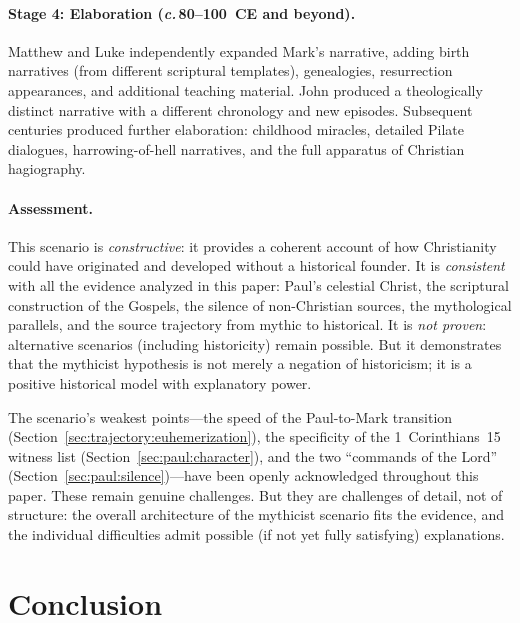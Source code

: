 \documentclass[12pt,oneside]{article}
\newcommand{\circa}{\textit{c.}\,}
\begin{document}
\paragraph{Stage 4: Elaboration (\circa 80--100~CE and beyond).}
Matthew and Luke independently expanded Mark's narrative, adding birth
narratives (from different scriptural templates), genealogies,
resurrection appearances, and additional teaching material.  John
produced a theologically distinct narrative with a different chronology
and new episodes.  Subsequent centuries produced further elaboration:
childhood miracles, detailed Pilate dialogues, harrowing-of-hell
narratives, and the full apparatus of Christian hagiography.

\paragraph{Assessment.}
This scenario is \textit{constructive}: it provides a coherent account
of how Christianity could have originated and developed without a
historical founder.  It is \textit{consistent} with all the evidence
analyzed in this paper: Paul's celestial Christ, the scriptural
construction of the Gospels, the silence of non-Christian sources, the
mythological parallels, and the source trajectory from mythic to
historical.  It is \textit{not proven}: alternative scenarios (including
historicity) remain possible.  But it demonstrates that the mythicist
hypothesis is not merely a negation of historicism; it is a positive
historical model with explanatory power.

The scenario's weakest points---the speed of the Paul-to-Mark
transition (Section~\ref{sec:trajectory:euhemerization}), the
specificity of the 1~Corinthians~15 witness list
(Section~\ref{sec:paul:character}), and the two ``commands of the Lord''
(Section~\ref{sec:paul:silence})---have been openly acknowledged
throughout this paper.  These remain genuine challenges.  But they are
challenges of detail, not of structure: the overall architecture of the
mythicist scenario fits the evidence, and the individual difficulties
admit possible (if not yet fully satisfying) explanations.


\section{Conclusion}
\label{sec:conclusion}
\end{document}
